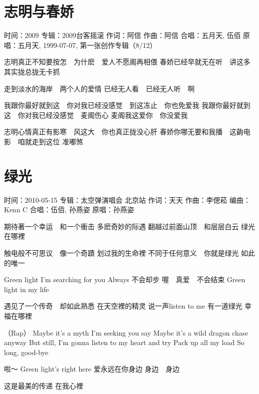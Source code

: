 \documentclass[UTF8,a4paper,oneside,twocolumn,12pt]{ctexbook}
\newcommand{\infopair}[2]{\textbullet #1：#2}
\newcommand{\zc}[1][伍佰]{\infopair{作词}{#1}}
\newcommand{\zq}[1][伍佰]{\infopair{作曲}{#1}}
\newcommand{\bq}[1][伍佰]{\infopair{编曲}{#1}}
\newcommand{\zj}[1]{\infopair{专辑}{#1}}
\newcommand{\yc}[1]{\infopair{原唱}{#1}}
\newcommand{\sj}[1]{\infopair{时间}{#1}}
\newenvironment{info}{\begin{flushleft}\kaishu
	}
	{\end{flushleft}\normalsize\yahei\par}
\newenvironment{lyric}{
	}
{}
\begin{document}
\section{志明与春娇}
\begin{info}
	\sj{2009}
	\zj{2009台客摇滚}
	\zc[阿信]
	\zq[阿信]
	\infopair{合唱}{五月天, 伍佰}
	\yc{五月天, 1999-07-07, 第一张创作专辑（8/12）}
\end{info}
\begin{lyric}
	志明真正不知要按怎　为什麽　爱人不愿阁再相偎
	春娇已经早就无在听　讲这多　其实拢总拢无卡抓

	走到淡水的海岸　两个人的爱情
	已经无人看　已经无人听　啊

	我跟你最好就到这　你对我已经没感觉　到这冻止　你也免爱我
	我跟你最好就到这　你对我已经没感觉　麦阁伤心
	麦阁我这爱你　你没爱我

	志明心情真正有影寒　风这大　你也真正拢没心肝
	春娇你哪无要和我播　这齣电影　咱就走到这位  准嘟煞
\end{lyric}

\section{绿光}
\begin{info}
	\sj{2010-05-15}
	\zj{太空弹演唱会 北京站}
	\zc[天天]
	\zq[李偲菘]
	\bq[Kenn C]
	\infopair{合唱}{伍佰, 孙燕姿}
	\yc{孙燕姿}
\end{info}
\begin{lyric}
	期待著一个幸运　和一个衝击
	多麽奇妙的际遇
	翻越过前面山顶　和层层白云
	绿光在哪裡

	触电般不可思议　像一个奇蹟
	划过我的生命裡
	不同于任何意义　你就是绿光
	如此的唯一

	Green light   I'm searching for you
	Always   不会却步
	喔　真爱　不会结束
	Green light in my life

	遇见了一个传奇　却如此熟悉
	在天空裡的精灵
	说一声listen to me 有一道绿光
	幸福在哪裡

	（Rap）
	Maybe it's a myth I'm seeking you say
	Maybe it's a wild dragon chase anyway
	But still, I'm gonna listen to my heart and try
	Pack up all my load
	So long, good-bye

	啦～
	Green light's right here
	爱永远在你身边
	身边　身边

	这是最美的传递
	在我心裡
\end{lyric}
\end{document}
